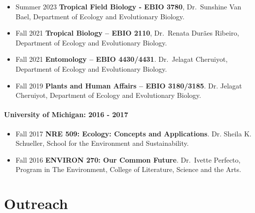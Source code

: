 \documentclass[11pt,a4paper,]{awesome-cv}
\begin{document}
\begin{itemize}
\item
  Summer 2023 \textbar{} \textbf{Tropical Field Biology - EBIO 3780},
  Dr.~Sunshine Van Bael, Department of Ecology and Evolutionary Biology.
\item
  Fall 2021 \textbar{} \textbf{Tropical Biology -- EBIO 2110},
  Dr.~Renata Durães Ribeiro, Department of Ecology and Evolutionary
  Biology.
\item
  Fall 2021 \textbar{} \textbf{Entomology -- EBIO 4430/4431}.
  Dr.~Jelagat Cheruiyot, Department of Ecology and Evolutionary Biology.
\item
  Fall 2019 \textbar{} \textbf{Plants and Human Affairs -- EBIO
  3180/3185}. Dr. Jelagat Cheruiyot, Department of Ecology and
  Evolutionary Biology.
\end{itemize}

\hypertarget{university-of-michigan-2016---2017}{%
\paragraph{University of Michigan: 2016 -
2017}\label{university-of-michigan-2016---2017}}

\begin{itemize}
\item
  Fall 2017 \textbar{} \textbf{NRE 509: Ecology: Concepts and
  Applications}. Dr. Sheila K. Schueller, School for the Environment and
  Sustainability.
\item
  Fall 2016 \textbar{} \textbf{ENVIRON 270: Our Common Future}.
  Dr.~Ivette Perfecto, Program in The Environment, College of
  Literature, Science and the Arts.\\
\end{itemize}

\hypertarget{outreach}{%
\section{\texorpdfstring{
Outreach}{ Outreach}}\label{outreach}}

\begin{cventries}
\end{cventries}
\end{document}
